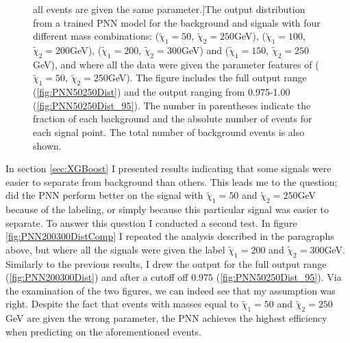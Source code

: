 \begin{figure}
    all events are given the same parameter.]{The output distribution from a trained \ac{PNN} model for the background and signals with four different 
    mass combinations: ($\tilde{\chi}_1=50$, $\tilde{\chi}_2=250$GeV), ($\tilde{\chi}_1=100$, $\tilde{\chi}_2=200$GeV), 
    ($\tilde{\chi}_1=200$, $\tilde{\chi}_2=300$GeV) and ($\tilde{\chi}_1=150$, $\tilde{\chi}_2=250$GeV), and where all the data were given the 
    parameter features of ($\tilde{\chi}_1=50$, $\tilde{\chi}_2=250$GeV). The figure includes the full output range (\ref{fig:PNN50250Dist}) 
    and the output ranging from 0.975-1.00 (\ref{fig:PNN50250Dist_95}). The number in parentheses indicate the fraction of each background and 
    the absolute number of events for each signal point. The total number of background events is also shown.}
    \label{fig:PNN50250}
\end{figure} 
In section \ref{sec:XGBoost} I presented results indicating that some signals were easier to separate from background than others. This leads me to the 
question; did the \ac{PNN} perform better on the signal with $\tilde{\chi}_1=50$ and $\tilde{\chi}_2=250$GeV because of the labeling, or simply
because this particular signal was easier to separate. To answer this question I conducted a second test. In figure \ref{fig:PNN200300DistComp} 
I repeated the analysis described in the paragraphs above, but where all the signals were given the label $\tilde{\chi}_1=200$ and $\tilde{\chi}_2=300$GeV.
Similarly to the previous results, I drew the output for the full output range (\ref{fig:PNN200300Dist}) and after a cutoff off $0.975$ (\ref{fig:PNN50250Dist_95}).
Via the examination of the two figures, we can indeed see that my assumption was right. Despite the fact that events with masses equal to $\tilde{\chi}_1=50$ and $\tilde{\chi}_2=250$GeV
are given the wrong parameter, the \ac{PNN} achieves the highest efficiency when predicting on the aforementioned events. \\
